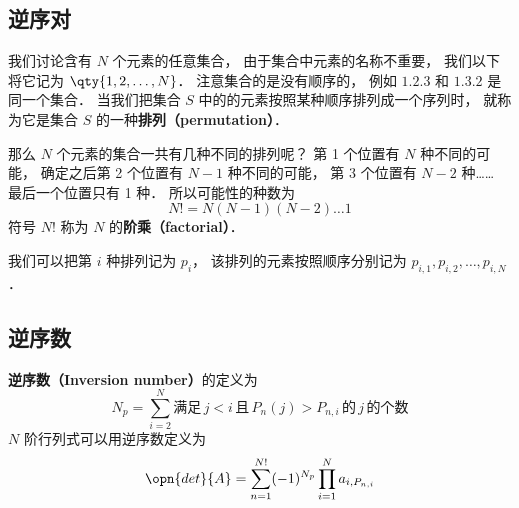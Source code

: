 

\subsection{逆序对}
我们讨论含有 $N$ 个元素的任意集合， 由于集合中元素的名称不重要， 我们以下将它记为 $\qty{1,2,\dots, N}$． 注意集合的是没有顺序的， 例如 $\qty{1,2,3}$ 和 $\qty{1,3,2}$ 是同一个集合． 当我们把集合 $S$ 中的的元素按照某种顺序排列成一个序列时， 就称为它是集合 $S$ 的一种\textbf{排列（permutation）}．

那么 $N$ 个元素的集合一共有几种不同的排列呢？ 第 1 个位置有 $N$ 种不同的可能， 确定之后第 2 个位置有 $N-1$ 种不同的可能， 第 3 个位置有 $N-2$ 种…… 最后一个位置只有 1 种． 所以可能性的种数为
\begin{equation}
N! = N(N-1)(N-2)\dots 1
\end{equation}
符号 $N!$ 称为 $N$ 的\textbf{阶乘（factorial）}．

我们可以把第 $i$ 种排列记为 $p_i$， 该排列的元素按照顺序分别记为 $p_{i,1}, p_{i,2}, \dots, p_{i,N}$．

\subsection{逆序数}
\textbf{逆序数（Inversion number）}的定义为
\begin{equation}\label{InvNum_eq5}
N_p = \sum_{i=2}^N \text{满足}\, j<i \,\text{且}\, P_n(j) > P_{n,i} \, \text{的}\, j\, \text{的个数} 
\end{equation}
$N$ 阶行列式可以用逆序数定义为
\begin{equation}\label{InvNum_eq4}
\opn{det}{A} = \sum_{n=1}^{N!} (-1)^{N_p} \prod_{i=1}^N a_{i,P_{n,i}}
\end{equation}

